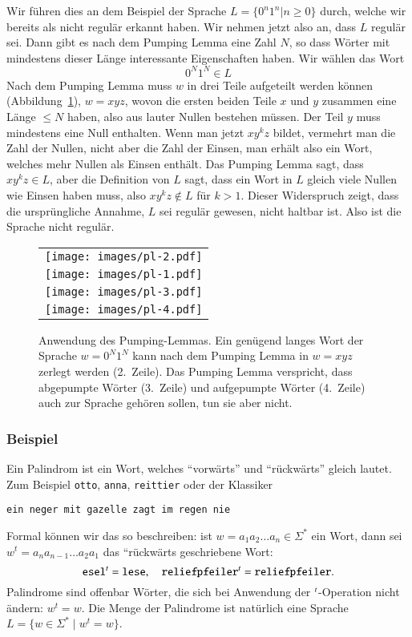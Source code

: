 \begin{beispiel}
Wir führen dies an dem Beispiel der Sprache $L=\{0^n1^n|n\ge 0\}$
durch, welche wir bereits als nicht regulär erkannt haben.
Wir nehmen jetzt also an, dass $L$ regulär sei.
Dann gibt es nach dem Pumping Lemma eine Zahl $N$, so dass Wörter mit
mindestens dieser Länge interessante Eigenschaften haben.
Wir wählen das Wort
\[
0^N1^N\in L
\]
Nach dem Pumping Lemma muss $w$ in drei Teile aufgeteilt werden können
(Abbildung~\ref{plimage}),
$w=xyz$,
wovon die ersten beiden Teile $x$ und $y$ zusammen eine Länge $\le N$
haben, also aus lauter Nullen bestehen müssen.
Der Teil $y$ muss mindestens eine Null enthalten.
Wenn man jetzt $xy^kz$ bildet, vermehrt man die Zahl der Nullen,
nicht aber die Zahl der Einsen, man erhält also ein Wort, welches
mehr Nullen als Einsen enthält.
Das Pumping Lemma sagt, dass $xy^kz\in L$, aber die Definition von $L$ sagt,
dass ein Wort in $L$ gleich viele Nullen wie Einsen haben muss, also
$xy^kz\not\in L$ für $k>1$.
Dieser Widerspruch zeigt, dass die ursprüngliche
Annahme, $L$ sei regulär gewesen, nicht haltbar ist.
Also ist die Sprache nicht regulär.
\begin{figure}
\begin{center}
\begin{tabular}{l}
\texttt{[image: images/pl-2.pdf]}\\
\texttt{[image: images/pl-1.pdf]}\\
\texttt{[image: images/pl-3.pdf]}\\
\texttt{[image: images/pl-4.pdf]}
\end{tabular}
\end{center}
\caption{Anwendung des Pumping-Lemmas.
Ein genügend langes Wort
der Sprache $w=0^N1^N$ kann nach dem Pumping Lemma in $w=xyz$ 
zerlegt werden (2.~Zeile).
Das Pumping Lemma verspricht, dass
abgepumpte Wörter (3.~Zeile) und aufgepumpte Wörter (4.~Zeile)
auch zur Sprache gehören sollen, tun sie aber nicht.
\label{plimage}}
\end{figure}
\end{beispiel}

\subsubsection{Beispiel}
%
Ein Palindrom ist ein Wort, welches ``vorwärts'' und ``rückwärts''
gleich lautet.
Zum Beispiel {\tt otto}, {\tt anna}, {\tt reittier} oder der
Klassiker
\begin{center}
{\tt ein neger mit gazelle zagt im regen nie}
\end{center}
Formal können wir das so beschreiben: ist $w=a_1a_2\dots a_n\in\Sigma^*$
ein Wort, dann sei $w^t=a_na_{n-1}\dots a_2a_1$ das ``rückwärts
geschriebene Wort:
\[
{\tt esel}^t={\tt lese},\quad {\tt reliefpfeiler}^t={\tt reliefpfeiler}.
\]
Palindrome sind offenbar Wörter, die sich bei Anwendung der
$\mathstrut^t$-Operation nicht ändern: $w^t=w$.
Die Menge der Palindrome
ist natürlich eine Sprache $L=\{w\in\Sigma^*\;|\;w^t=w\}$.

